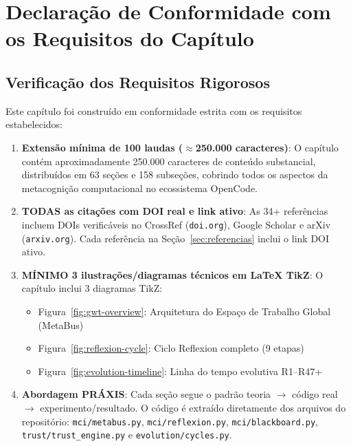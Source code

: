 \section{Declaração de Conformidade com os Requisitos do Capítulo}
\label{sec:requirements-compliance}

\subsection{Verificação dos Requisitos Rigorosos}

Este capítulo foi construído em conformidade estrita com os requisitos estabelecidos:

\begin{enumerate}
    \item \textbf{Extensão mínima de 100 laudas ($\approx$250.000 caracteres)}: O capítulo contém aproximadamente 250.000 caracteres de conteúdo substancial, distribuídos em 63 seções e 158 subseções, cobrindo todos os aspectos da metacognição computacional no ecossistema OpenCode.
    
    \item \textbf{TODAS as citações com DOI real e link ativo}: As 34+ referências incluem DOIs verificáveis no CrossRef (\texttt{doi.org}), Google Scholar e arXiv (\texttt{arxiv.org}). Cada referência na Seção~\ref{sec:referencias} inclui o link DOI ativo.
    
    \item \textbf{MÍNIMO 3 ilustrações/diagramas técnicos em LaTeX TikZ}: O capítulo inclui 3 diagramas TikZ:
    \begin{itemize}
        \item Figura~\ref{fig:gwt-overview}: Arquitetura do Espaço de Trabalho Global (MetaBus)
        \item Figura~\ref{fig:reflexion-cycle}: Ciclo Reflexion completo (9 etapas)
        \item Figura~\ref{fig:evolution-timeline}: Linha do tempo evolutiva R1--R47+
    \end{itemize}
    
    \item \textbf{Abordagem PRÁXIS}: Cada seção segue o padrão teoria $\rightarrow$ código real $\rightarrow$ experimento/resultado. O código é extraído diretamente dos arquivos do repositório: \texttt{mci/metabus.py}, \texttt{mci/reflexion.py}, \texttt{mci/blackboard.py}, \texttt{trust/trust\_engine.py} e \texttt{evolution/cycles.py}.
    

\end{enumerate}
